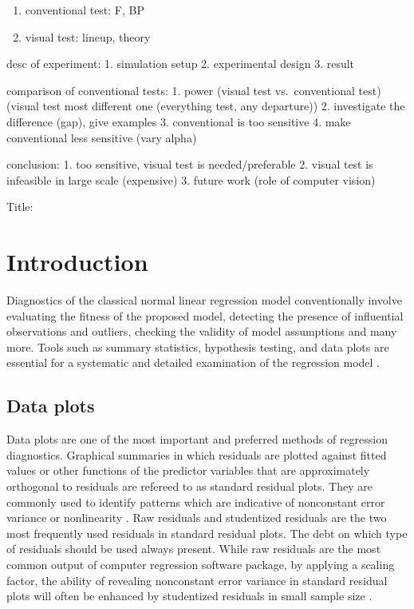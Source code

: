 \documentclass[]{interact}
\theoremstyle{plain}%
\theoremstyle{definition}
\theoremstyle{remark}
\def\tightlist{}
\begin{document}
\begin{enumerate}
\def\labelenumi{\arabic{enumi}.}
\setcounter{enumi}{1}
\tightlist
\item
  conventional test: F, BP
\item
  visual test: lineup, theory
\end{enumerate}

desc of experiment: 1. simulation setup 2. experimental design 3. result

comparison of conventional tests: 1. power (visual test vs.~conventional
test) (visual test most different one (everything test, any departure))
2. investigate the difference (gap), give examples 3. conventional is
too sensitive 4. make conventional less sensitive (vary alpha)

conclusion: 1. too sensitive, visual test is needed/preferable 2. visual
test is infeasible in large scale (expensive) 3. future work (role of
computer vision)

Title:

\hypertarget{introduction}{%
\section{Introduction}\label{introduction}}

Diagnostics of the classical normal linear regression model
conventionally involve evaluating the fitness of the proposed model,
detecting the presence of influential observations and outliers,
checking the validity of model assumptions and many more. Tools such as
summary statistics, hypothesis testing, and data plots are essential for
a systematic and detailed examination of the regression model
\citep{mansfield1987diagnostic}.

\hypertarget{data-plots}{%
\subsection{Data plots}\label{data-plots}}

Data plots are one of the most important and preferred methods of
regression diagnostics. Graphical summaries in which residuals are
plotted against fitted values or other functions of the predictor
variables that are approximately orthogonal to residuals are refereed to
as standard residual plots. They are commonly used to identify patterns
which are indicative of nonconstant error variance or nonlinearity
\citep{cook1982residuals}. Raw residuals and studentized residuals are
the two most frequently used residuals in standard residual plots. The
debt on which type of residuals should be used always present. While raw
residuals are the most common output of computer regression software
package, by applying a scaling factor, the ability of revealing
nonconstant error variance in standard residual plots will often be
enhanced by studentized residuals in small sample size
\citep{gunst2018regression}.
\end{document}
